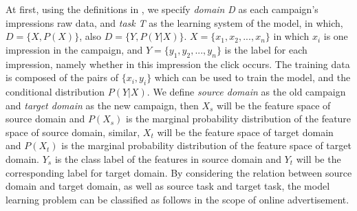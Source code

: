 At first, using the definitions in \cite{pan2010survey}, we specify \textit{domain} \textit{D} as each campaign's impressions raw data, and \textit{task} \textit{T} as the learning system of the model, in which, \(D = \{X,P(X)\}\), also  \(D = \{Y,P(Y|X)\}\). \(X = \{x_1,x_2, ..., x_n\}\) in which \(x_i\) is one impression in the campaign, and \(Y = \{y_1,y_2, ..., y_n\}\) is the label for each impression, namely whether in this impression the click occurs. The training data is composed of the pairs of \(\{x_i,y_i\}\) which can be used to train the model, and the conditional distribution \(P(Y|X)\). We define \textit{source domain} as the old campaign and \textit{target domain} as the new campaign, then \(X_s\) will be the feature space of source domain and \(P(X_s)\) is the marginal probability distribution of the feature space of source domain, similar, \(X_t\) will be the feature space of target domain and \(P(X_t)\) is the marginal probability distribution of the feature space of target domain. \(Y_s\) is the class label of the features in source domain and \(Y_t\) will be the corresponding label for target domain. By considering the relation between source domain and target domain, as well as source task and target task, the model learning problem can be classified as follows in the scope of online advertisement. 

